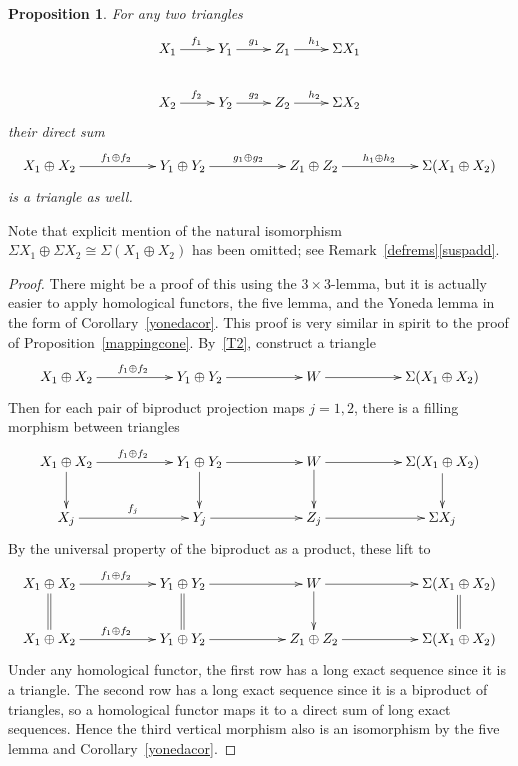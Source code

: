 \documentclass{amsproc}
\newtheorem{prop}{Proposition}[section]
\theoremstyle{definition}
\begin{document}
\begin{prop}
\label{sumtriangles}
For any two triangles
\begin{displaymath}
\xymatrix{X_1\ar[r]^{f_1} & Y_1\ar[r]^{g_1} & Z_1\ar[r]^{h_1} & {}\Sigma X_1\\
X_2\ar[r]^{f_2} & Y_2\ar[r]^{g_2} & Z_2\ar[r]^{h_2} & {}\Sigma X_2}
\end{displaymath}
their direct sum
\begin{displaymath}
\xymatrix{X_1\oplus X_2\ar[rr]^{f_1\oplus f_2} && Y_1\oplus Y_2\ar[rr]^{g_1\oplus g_2} && Z_1\oplus Z_2\ar[rr]^(.45){h_1\oplus h_2} && {}\Sigma(X_1\oplus X_2)}
\end{displaymath}
is a triangle as well.
\end{prop}

\noindent Note that explicit mention of the natural isomorphism $\Sigma X_1\oplus\Sigma X_2\cong \Sigma(X_1\oplus X_2)$ has been omitted; see Remark~\ref{defrems}\ref{suspadd}.

\begin{proof}
There might be a proof of this using the $3\!\!\times\!\!3$-lemma, but it is actually easier to apply homological functors, the five lemma, and the Yoneda lemma in the form of Corollary~\ref{yonedacor}. This proof is very similar in spirit to the proof of Proposition~\ref{mappingcone}. By~\ref{T2}, construct a triangle
\begin{displaymath}
\xymatrix{X_1\oplus X_2\ar[rr]^{f_1\oplus f_2} && Y_1\oplus Y_2\ar[rr] && W\ar[rr] && {}\Sigma(X_1\oplus X_2)}
\end{displaymath}
Then for each pair of biproduct projection maps $j=1,2$, there is a filling morphism between triangles
\begin{displaymath}
\xymatrix{X_1\oplus X_2\ar[rr]^{f_1\oplus f_2}\ar[d] && Y_1\oplus Y_2\ar[rr]\ar[d] && W\ar[rr]\ar[d] && {}\Sigma(X_1\oplus X_2)\ar[d]\\
X_j\ar[rr]^{f_j} && Y_j\ar[rr] && Z_j\ar[rr] && \Sigma X_j}
\end{displaymath}
By the universal property of the biproduct as a product, these lift to
\begin{displaymath}
\xymatrix{X_1\oplus X_2\ar[rr]^{f_1\oplus f_2}\ar@{=}[d] && Y_1\oplus Y_2\ar[rr]\ar@{=}[d] && W\ar[rr]\ar[d] && {}\Sigma(X_1\oplus X_2)\ar@{=}[d]\\
X_1\oplus X_2\ar[rr]^{f_1\oplus f_2} && Y_1\oplus Y_2\ar[rr] && Z_1\oplus Z_2\ar[rr] && \Sigma (X_1\oplus X_2)}
\end{displaymath}
Under any homological functor, the first row has a long exact sequence since it is a triangle. The second row has a long exact sequence since it is a biproduct of triangles, so a homological functor maps it to a direct sum of long exact sequences. Hence the third vertical morphism also is an isomorphism by the five lemma and Corollary~\ref{yonedacor}.
\end{proof}
\end{document}
